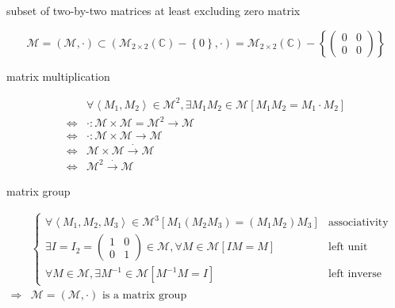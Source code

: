 \documentclass[
]{book}
\theoremstyle{definition}
\theoremstyle{definition}
\theoremstyle{definition}
\theoremstyle{definition}
\theoremstyle{remark}
\begin{document}
subset of two-by-two matrices at least excluding zero matrix

\[
\mathcal{M}=\left(\mathcal{M},\cdot\right)\subset\left(\mathcal{M}_{2\times2}\left(\mathbb{C}\right)-\left\{ 0\right\} ,\cdot\right)=\mathcal{M}_{2\times2}\left(\mathbb{C}\right)-\left\{ \begin{pmatrix}0 & 0\\
0 & 0
\end{pmatrix}\right\} 
\]

matrix multiplication

\[
\begin{aligned}
 & \forall\left\langle M_{{\scriptscriptstyle 1}},M_{{\scriptscriptstyle 2}}\right\rangle \in\mathcal{M}^{2},\exists M_{{\scriptscriptstyle 1}}M_{{\scriptscriptstyle 2}}\in\mathcal{M}\left[M_{{\scriptscriptstyle 1}}M_{{\scriptscriptstyle 2}}=M_{{\scriptscriptstyle 1}}\cdot M_{{\scriptscriptstyle 2}}\right]\\
\Leftrightarrow & \cdot:\mathcal{M}\times\mathcal{M}=\mathcal{M}^{2}\rightarrow\mathcal{M}\\
\Leftrightarrow & \cdot:\mathcal{M}\times\mathcal{M}\rightarrow\mathcal{M}\\
\Leftrightarrow & \mathcal{M}\times\mathcal{M}\overset{\cdot}{\rightarrow}\mathcal{M}\\
\Leftrightarrow & \mathcal{M}^{2}\overset{\cdot}{\rightarrow}\mathcal{M}
\end{aligned}
\]

matrix group

\[
\begin{aligned}
 & \begin{cases}
\forall\left\langle M_{{\scriptscriptstyle 1}},M_{{\scriptscriptstyle 2}},M_{{\scriptscriptstyle 3}}\right\rangle \in\mathcal{M}^{3}\left[M_{{\scriptscriptstyle 1}}\left(M_{{\scriptscriptstyle 2}}M_{{\scriptscriptstyle 3}}\right)=\left(M_{{\scriptscriptstyle 1}}M_{{\scriptscriptstyle 2}}\right)M_{{\scriptscriptstyle 3}}\right] & \text{associativity}\\
\exists I=I_{2}=\begin{pmatrix}1 & 0\\
0 & 1
\end{pmatrix}\in\mathcal{M},\forall M\in\mathcal{M}\left[IM=M\right] & \text{left unit element}\\
\forall M\in\mathcal{M},\exists M^{-1}\in\mathcal{M}\left[M^{-1}M=I\right] & \text{left inverse (element)}
\end{cases}\\
\Rightarrow & \mathcal{M}=\left(\mathcal{M},\cdot\right)\text{ is a matrix group}
\end{aligned}
\]
\end{document}
